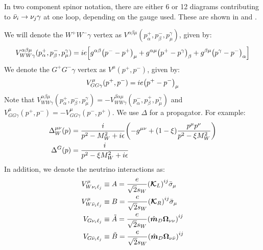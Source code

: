 In two component spinor notation, there are either 6 or 12 diagrams contributing to
\(\bar{\nu}_{i}\to\nu_{j}\gamma\) at one loop, depending on the gauge used. These are shown in
 and .




We will denote the \(W^{+}W^{-}\gamma\) vertex as \(V^{\alpha\beta\mu}(p^{+}_{\alpha},p^{-}_{\beta},p^{\gamma}_{\mu})\),
given by:
\begin{align}
	V_{WW\gamma}^{\alpha\beta\mu}(p^{+}_{\alpha},p^{-}_{\beta},p^{\gamma}_{\mu}) =
	ie\qty[
		g^{\alpha\beta}\qty(p^{-}-p^{+})_{\mu} +
		g^{\alpha\mu}\qty(p^{+}-p^{\gamma})_{\beta} +
		g^{\beta\mu}\qty(p^{\gamma}-p^{-})_{\alpha}
	]
\end{align}
We denote the \(G^{+}G^{-}\gamma\) vertex as \(V^{\mu}(p^{+},p^{-})\), given by:
\begin{align}
	V_{GG\gamma}^{\mu}(p^{+},p^{-}) = ie\qty(p^{+} - p^{-})_{\mu}
\end{align}
Note that \(V_{WW\gamma}^{\alpha\beta\mu}(p^{+}_{\alpha},p^{-}_{\beta},p^{\gamma}_{\mu}) = -V_{WW\gamma}^{\beta\alpha\mu}(p^{-}_{\alpha},p^{+}_{\beta},p^{\gamma}_{\mu})\)
and \(V_{GG\gamma}^{\mu}(p^{+},p^{-}) = - V_{GG\gamma}^{\mu}(p^{-},p^{+})\).
We use \(\Delta\) for a propagator. For example:
\begin{align}
	\Delta^{\mu\nu}_{W}(p) & = \frac{i}{p^2-M_{W}^{2}+i\epsilon}\qty(-g^{\mu\nu} + (1-\xi)\frac{p^{\mu}p^{\nu}}{p^{2}-\xi M_{W}^{2}}) \\
	\Delta^{G}(p)          & = \frac{i}{p^2-\xi M_{W}^{2}+i\epsilon}
\end{align}
In addition, we denote the neutrino interactions as:
\begin{align}
	V^{\mu}_{W\nu_{i}\ell_{j}}  & \equiv A = \frac{e}{\sqrt{2}{s_{W}}}\qty(\bm{\mathcal{K}}_{L})^{ij}\bar{\sigma}_{\mu}     \\
	V^{\mu}_{W\bar{\nu}_{i}\ell_{j}} & \equiv B = \frac{e}{\sqrt{2}{s_{W}}}\qty(\bm{\mathcal{K}}_{R})^{ij}\bar{\sigma}_{\mu}     \\
	V_{G\nu_{i}\ell_{j}}        & \equiv \tilde{A} =  \frac{e}{\sqrt{2}{s_{W}}}\qty(\hat{\bm{m}}_{D}\bm{\Omega}_{\nu\nu})^{ij} \\
	V_{G\bar{\nu}_{i}\ell_{j}}       & \equiv \tilde{B} = \frac{e}{\sqrt{2}{s_{W}}}\qty(\hat{\bm{m}}_{D}\bm{\Omega}_{\nu\bar{\nu}})^{ij}
\end{align}


